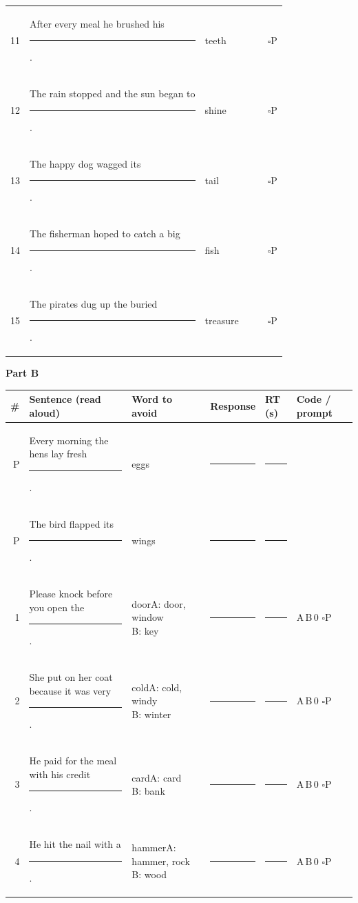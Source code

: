 \documentclass[10pt,a4paper]{article}
\newcommand{\blank}[1][1.2cm]{\rule{#1}{0.4pt}}
\newcommand{\bx}{$\square$}
\begin{document}
{\begin{longtable}{@{}r>{\raggedright\arraybackslash}p{7.2cm}>{\raggedright\arraybackslash}p{1.9cm}p{2.4cm}p{1.1cm}l@{}}
11 & After every meal he brushed his \rule{1.1cm}{0.4pt}. & teeth & \blank[2.2cm] & \blank[0.9cm] & \bx P\\
12 & The rain stopped and the sun began to \rule{1.1cm}{0.4pt}. & shine & \blank[2.2cm] & \blank[0.9cm] & \bx P\\
13 & The happy dog wagged its \rule{1.1cm}{0.4pt}. & tail & \blank[2.2cm] & \blank[0.9cm] & \bx P\\
14 & The fisherman hoped to catch a big \rule{1.1cm}{0.4pt}. & fish & \blank[2.2cm] & \blank[0.9cm] & \bx P\\
15 & The pirates dug up the buried \rule{1.1cm}{0.4pt}. & treasure & \blank[2.2cm] & \blank[0.9cm] & \bx P\\
\bottomrule\end{longtable}}
\par{}\medskip\textbf{Part B}\par{\small\begin{longtable}{@{}r>{\raggedright\arraybackslash}p{7.2cm}>{\raggedright\arraybackslash}p{1.9cm}p{2.4cm}p{1.1cm}l@{}}\toprule \# & Sentence (read aloud) & Word to avoid & Response & RT (s) & Code / prompt\\ \midrule\endhead
P & Every morning the hens lay fresh \rule{1.1cm}{0.4pt}. & eggs & \blank[2.2cm] & \blank[0.9cm] & \\
P & The bird flapped its \rule{1.1cm}{0.4pt}. & wings & \blank[2.2cm] & \blank[0.9cm] & \\
\midrule
1 & Please knock before you open the \rule{1.1cm}{0.4pt}. & door\newline{\scriptsize A: door, window\newline B: key} & \blank[2.2cm] & \blank[0.9cm] & A\,B\,0 \bx P\\
2 & She put on her coat because it was very \rule{1.1cm}{0.4pt}. & cold\newline{\scriptsize A: cold, windy\newline B: winter} & \blank[2.2cm] & \blank[0.9cm] & A\,B\,0 \bx P\\
3 & He paid for the meal with his credit \rule{1.1cm}{0.4pt}. & card\newline{\scriptsize A: card\newline B: bank} & \blank[2.2cm] & \blank[0.9cm] & A\,B\,0 \bx P\\
4 & He hit the nail with a \rule{1.1cm}{0.4pt}. & hammer\newline{\scriptsize A: hammer, rock\newline B: wood} & \blank[2.2cm] & \blank[0.9cm] & A\,B\,0 \bx P\\

\end{longtable}}
\end{document}
